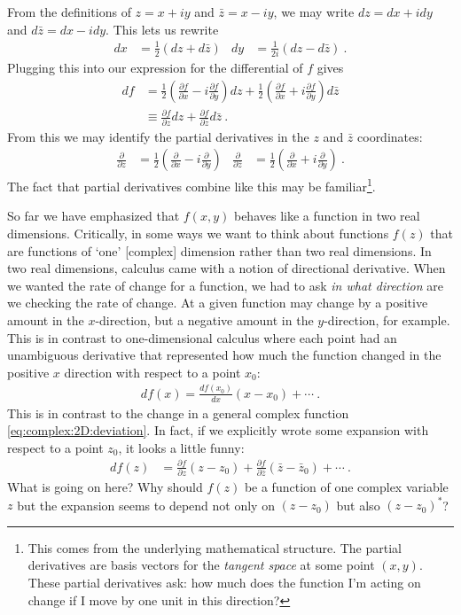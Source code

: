 From the definitions of $z=x+iy$ and $\bar z = x-iy$, we may write $dz = dx+idy$ and $d\bar z = dx-idy$. This lets us rewrite
\begin{align}
  dx &= \frac{1}{2}(dz+d\bar z)
  &
  dy &= \frac{1}{2i}(dz-d\bar z) \ .
\end{align}
Plugging this into our expression for the differential of $f$ gives
\begin{align}
  df &= \frac{1}{2}
  \left(
    \frac{\partial f}{\partial x}
    -i\frac{\partial f}{\partial y}
  \right)dz
  + 
  \frac{1}{2}
  \left(
    \frac{\partial f}{\partial x}
    +i\frac{\partial f}{\partial y}
  \right)d\bar z 
  \\
  &\equiv \frac{\partial f}{\partial z}dz
  + \frac{\partial f}{\partial \bar z}d\bar z
  \label{eq:complex:2D:deviation}
  \ .
\end{align}
From this we may identify the partial derivatives in the $z$ and $\bar z$ coordinates:
\begin{align}
  \frac{\partial}{\partial z} &= 
  \frac{1}{2}
  \left(
  \frac{\partial}{\partial x}
  -i
  \frac{\partial}{\partial y}
  \right)
  &
  \frac{\partial}{\partial \bar z} &= 
  \frac{1}{2}
  \left(
  \frac{\partial}{\partial x}
  +i
  \frac{\partial}{\partial y}
  \right) 
  \ .
  \label{eq:ddz:ddzst}
\end{align}
The fact that partial derivatives combine like this may be familiar\footnote{This comes from the underlying mathematical structure. The partial derivatives are basis vectors for the \emph{tangent space} at some point $(x,y)$. These partial derivatives ask: how much does the function I'm acting on change if I move by one unit in this direction?}. 

So far we have emphasized that $f(x,y)$ behaves like a function in two real dimensions. Critically, in some ways we want to think about functions $f(z)$ that are functions of `one' [complex] dimension rather than two real dimensions. In two real dimensions, calculus came with a notion of directional derivative. When we wanted the rate of change for a function, we had to ask \emph{in what direction} are we checking the rate of change. At a given function may change by a positive amount in the $x$-direction, but a negative amount in the $y$-direction, for example. This is in contrast to one-dimensional calculus where each point had an unambiguous derivative that represented how much the function changed in the positive $x$ direction with respect to a point $x_0$:
\begin{align}
  df(x) = \frac{d f(x_0)}{d x} (x-x_0) + \cdots \ .
\end{align}
This is in contrast to the change in a general complex function \eqref{eq:complex:2D:deviation}. In fact, if we explicitly wrote some expansion with respect to a point $z_0$, it looks a little funny:
\begin{align}
  df(z) &= 
  \frac{\partial f}{\partial z}(z-z_0) +
  \frac{\partial f}{\partial \bar z}(\bar z-\bar z_0) + \cdots \ .
\end{align}
What is going on here? Why should $f(z)$ be a function of one complex variable $z$ but the expansion seems to depend not only on $(z-z_0)$ but also $(z-z_0)^*$? 




